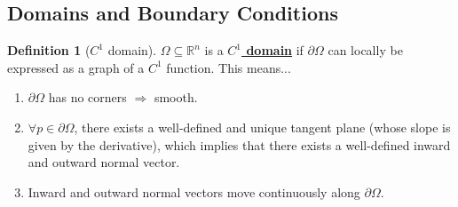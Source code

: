 \documentclass[11pt]{scrartcl}
\newcommand{\R}[0]{\mathbb{R}}
\theoremstyle{definition}
\newtheorem{definition}{Definition}
\theoremstyle{remark}
\newcommand{\dfn}[1]{\textbf{\underline{#1}}}
\begin{document}
\subsection{Domains and Boundary Conditions}

\begin{definition}[$C^1$ domain] 
	$\Omega \subseteq \R^n$ is a \dfn{$C^1$ domain} if $\partial \Omega$ can locally be expressed as a graph of a $C^1$ function. This means...
	\begin{enumerate}[noitemsep]
		\item $\partial \Omega$ has no corners $\Rightarrow$ smooth. 
		\item $\forall p \in \partial \Omega$, there exists a well-defined and unique tangent plane (whose slope is given by the derivative), which implies that there exists a well-defined inward and outward normal vector. 
		\item Inward and outward normal vectors move continuously along $\partial \Omega$. 
	\end{enumerate}
\end{definition}
\end{document}
